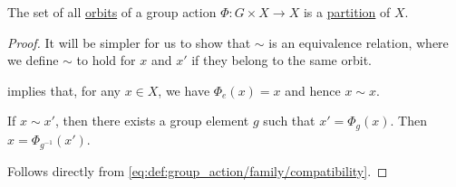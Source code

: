 \begin{proposition}\label{thm:orbit_induces_partition}
  The set of all \hyperref[def:group_action_orbit]{orbits} of a group action \( \Phi: G \times X \to X \) is a \hyperref[def:set_partition]{partition} of \( X \).
\end{proposition}
\begin{proof}
  It will be simpler for us to show that \( {\sim} \) is an equivalence relation, where we define \( {\sim} \) to hold for \( x \) and \( x' \) if they belong to the same orbit.

    implies that, for any \( x \in X \), we have \( \Phi_e(x) = x \) and hence \( x \sim x \).

   If \( x \sim x' \), then there exists a group element \( g \) such that \( x' = \Phi_g(x) \). Then \( x = \Phi_{g^{-1}}(x') \).

   Follows directly from \eqref{eq:def:group_action/family/compatibility}.
\end{proof}


